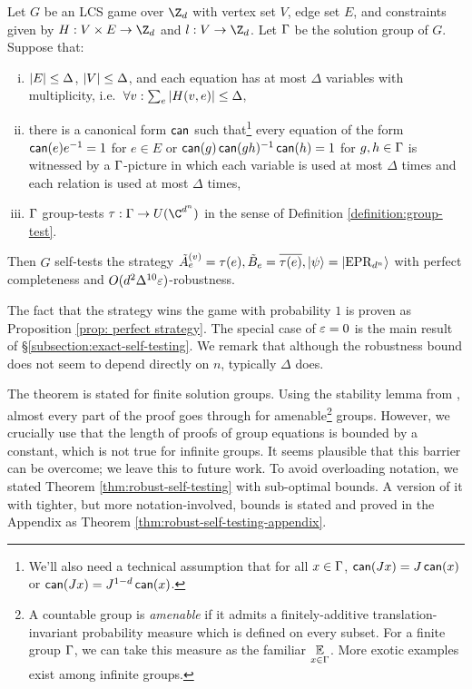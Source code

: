 \begin{theorem}\label{thm:robust-self-testing}
	Let $G$ be an LCS game over $\Z_d$ with vertex set $V$, edge set $E$, and constraints given by  $H:V\times E \to \Z_d$ and $l: V\to \Z_d$. Let $\Gamma$ be the solution group of $G$. Suppose that:
	\begin{enumerate}[(i)]
		\item \label{assumption:bounded-degree}
		 $\left\vert E\right\vert \leq \Delta$, $\left\vert V\right\vert \leq \Delta$, and
		 each equation has at most $\Delta$ variables with multiplicity, i.e.\ \mbox{$\forall v:\sum_e\left\vert H(v,e)\right\vert \leq \Delta$},
		\item \label{assumption:small-pictures}there is a canonical form $\operatorname*{\mathsf{can}}$ such that\footnote{We'll also need a technical assumption that for all $x\in \Gamma$, $\operatorname*{\mathsf{can}}(Jx) = J\operatorname*{\mathsf{can}}(x)$ or $\operatorname*{\mathsf{can}}(Jx) = J^{1-d}\operatorname*{\mathsf{can}}(x)$.} 
		every equation of the form  $\operatorname*{\mathsf{can}}(e)e^{-1} = 1$ for $e\in E$ or $\operatorname*{\mathsf{can}}(g)\operatorname*{\mathsf{can}}(gh)^{-1}\operatorname*{\mathsf{can}}(h) = 1$ for $g,h\in \Gamma$ is witnessed by a $\Gamma$-picture in which 
		 each variable is used at most $\Delta$ times
		 and 
		 each relation is used at most $\Delta$ times,
		\item \label{assumption:w-p-irreps}
		 $\Gamma$ group-tests $\tau: \G \to U(\C^{d^n}) $ in the sense of Definition \ref{definition:group-test}.
	\end{enumerate}
	Then $G$ self-tests the strategy $\tilde A_e^{(v)} = \tau(e), \tilde B_e = \overline{\tau(e)}, \ket\psi = \ket{\mathrm{EPR}_{d^n}}$
	with perfect completeness and $O(d^2\Delta^{10}\varepsilon)$-robustness.

\end{theorem}
The fact that the strategy wins the game with probability $1$ is proven as Proposition \ref{prop: perfect strategy}. The special case of $\varepsilon=0$ is the main result of \S \ref{subsection:exact-self-testing}. We remark that although the robustness bound does not seem to depend directly on $n$, typically $\Delta$ does.

The theorem is stated for finite solution groups. Using the stability lemma from \cite{de2017operator}, almost every part of the proof goes through for amenable\footnote{A countable group is \emph{amenable} if it admits a finitely-additive translation-invariant probability measure which is defined on every subset. For a finite group $\Gamma$, we can take this measure as the familiar $\operatorname*{\mathbb E}\limits_{x\in \Gamma}$. More exotic examples exist among infinite groups.} groups. However, we crucially use that the length of proofs of group equations is bounded by a constant, which is not true for infinite groups. It seems plausible that this barrier can be overcome; we leave this to future work. To avoid overloading notation, we stated Theorem \ref{thm:robust-self-testing} with sub-optimal bounds. A version of it with tighter, but more notation-involved, bounds is stated and proved in the Appendix as Theorem \ref{thm:robust-self-testing-appendix}.


